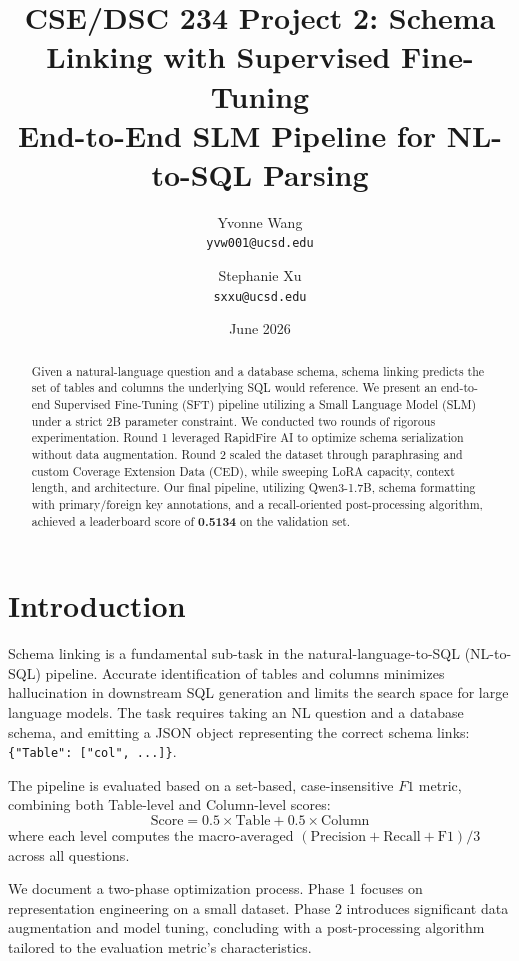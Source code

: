 \documentclass[10pt,twocolumn]{article}
\title{\textbf{CSE/DSC 234 Project 2: Schema Linking with Supervised Fine-Tuning}\\
       \large End-to-End SLM Pipeline for NL-to-SQL Parsing}
\author{
  Yvonne Wang \\
  \texttt{yvw001@ucsd.edu}
  \and
  Stephanie Xu \\
  \texttt{sxxu@ucsd.edu}
}
\date{June 2026}
\begin{document}
\maketitle

\begin{abstract}
Given a natural-language question and a database schema, schema linking predicts the set of tables and columns the underlying SQL would reference. We present an end-to-end Supervised Fine-Tuning (SFT) pipeline utilizing a Small Language Model (SLM) under a strict 2B parameter constraint. We conducted two rounds of rigorous experimentation. Round 1 leveraged RapidFire AI to optimize schema serialization without data augmentation. Round 2 scaled the dataset through paraphrasing and custom Coverage Extension Data (CED), while sweeping LoRA capacity, context length, and architecture. Our final pipeline, utilizing Qwen3-1.7B, schema formatting with primary/foreign key annotations, and a recall-oriented post-processing algorithm, achieved a leaderboard score of \textbf{0.5134} on the validation set.
\end{abstract}

\section{Introduction}
\label{sec:intro}

Schema linking is a fundamental sub-task in the natural-language-to-SQL (NL-to-SQL) pipeline. Accurate identification of tables and columns minimizes hallucination in downstream SQL generation and limits the search space for large language models. The task requires taking an NL question and a database schema, and emitting a JSON object representing the correct schema links: \texttt{\{"Table": ["col", ...]\}}.

The pipeline is evaluated based on a set-based, case-insensitive $F1$ metric, combining both Table-level and Column-level scores:
\begin{equation}
    \text{Score} = 0.5 \times \text{Table} + 0.5 \times \text{Column}
\end{equation}
where each level computes the macro-averaged $(\text{Precision} + \text{Recall} + \text{F1})/3$ across all questions.

We document a two-phase optimization process. Phase 1 focuses on representation engineering on a small dataset. Phase 2 introduces significant data augmentation and model tuning, concluding with a post-processing algorithm tailored to the evaluation metric's characteristics.
\end{document}
